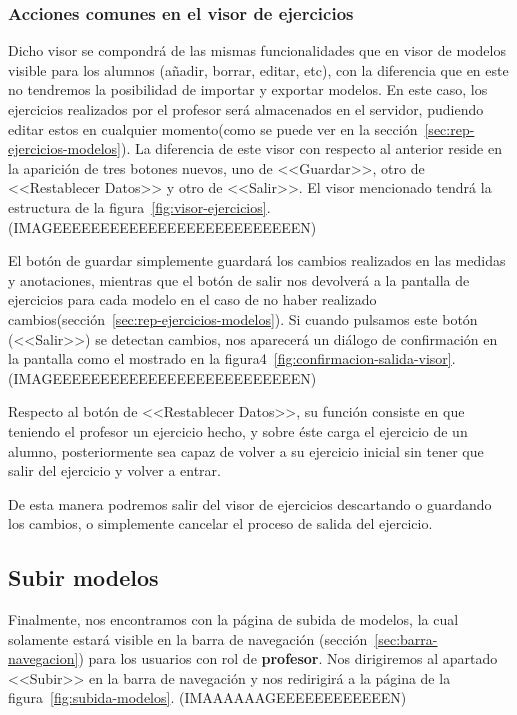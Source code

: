 \subsubsection{Acciones comunes en el visor de ejercicios}
Dicho visor se compondrá de las mismas funcionalidades que en visor de modelos visible para los alumnos (añadir, borrar, editar, etc), con la diferencia que en este no tendremos la posibilidad de importar y exportar modelos. En este caso, los ejercicios realizados por el profesor será almacenados en el servidor, pudiendo editar estos en cualquier momento(como se puede ver en la sección~\ref{sec:rep-ejercicios-modelos}). La diferencia de este visor con respecto al anterior reside en la aparición de tres botones nuevos, uno de <<Guardar>>, otro de <<Restablecer Datos>> y otro de <<Salir>>. El visor mencionado tendrá la estructura de la figura~\ref{fig:visor-ejercicios}.
(IMAGEEEEEEEEEEEEEEEEEEEEEEEEEEN)

El botón de guardar simplemente guardará los cambios realizados en las medidas y anotaciones, mientras que el botón de salir nos devolverá a la pantalla de ejercicios para cada modelo en el caso de no haber realizado cambios(sección~\ref{sec:rep-ejercicios-modelos}). Si cuando pulsamos este botón (<<Salir>>) se detectan cambios, nos aparecerá un diálogo de confirmación en la pantalla como el mostrado en la figura4~\ref{fig:confirmacion-salida-visor}.
(IMAGEEEEEEEEEEEEEEEEEEEEEEEEEEN)

Respecto al botón de <<Restablecer Datos>>, su función consiste en que teniendo el profesor un ejercicio hecho, y sobre éste carga el ejercicio de un alumno, posteriormente sea capaz de volver a su ejercicio inicial sin tener que salir del ejercicio y volver a entrar.

De esta manera podremos salir del visor de ejercicios descartando o guardando los cambios, o simplemente cancelar el proceso de salida del ejercicio.

\subsection{Subir modelos}\label{sec:subir-modelos}
Finalmente, nos encontramos con la página de subida de modelos, la cual solamente estará visible en la barra de navegación (sección~\ref{sec:barra-navegacion}) para los usuarios con rol de \textbf{profesor}. Nos dirigiremos al apartado <<Subir>> en la barra de navegación y nos redirigirá a la página de la figura~\ref{fig:subida-modelos}.
(IMAAAAAAGEEEEEEEEEEEEN)

